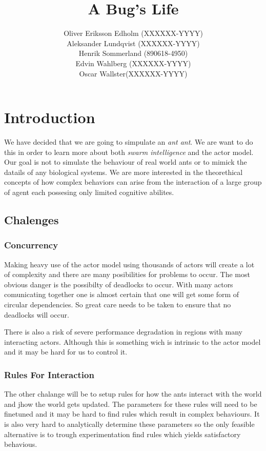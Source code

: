 \documentclass[a4paper]{article}
\title{A Bug's Life}
\author{Oliver Eriksson Edholm (XXXXXX-YYYY) \\
		Aleksander Lundqvist (XXXXXX-YYYY) \\
		Henrik Sommerland (890618-4950) \\
		Edvin Wahlberg (XXXXXX-YYYY) \\
		Oscar Wallster(XXXXXX-YYYY)}
\begin{document}
\maketitle

\section{Introduction}
We have decided that we are going to simpulate an \emph{ant ant}. We are want to do this in order to learn
more about both \emph{swarm intelligence} and the actor model.\\
Our goal is not to simulate the behaviour of real world ants or to mimick the datails of any biological systems.
We are more interested in the theorethical concepts of how complex behaviors can arise from the interaction of
a large group of agent each possesing only limited cognitive abilites.

\subsection{Chalenges}
\subsubsection{Concurrency}
Making heavy use of the actor model using thousands of actors will create a lot of complexity and there are many posibilities for
problems to occur. The most obvious danger is the possibilty of deadlocks to occur. With many actors comunicating together one is
almost certain that one will get some form of circular dependencies. So great care needs to be taken to ensure that no deadlocks will occur.

There is also a risk of severe performance degradation in regions with many interacting actors. Although this is something wich is intrinsic to
the actor model and it may be hard for us to control it.
\subsubsection{Rules For Interaction}
The other chalange will be to setup rules for how the ants interact with the world and jhow the world gets updated. The parameters for these rules will need to be
finetuned and it may be hard to find rules which result in complex behaviours. It is also very hard to analytically determine these parameters so the only
feasible alternative is to trough experimentation find rules which yields satisfactory behavious.
\end{document}
